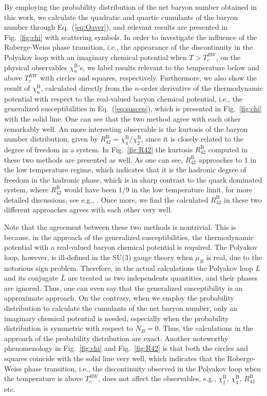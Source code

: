 \documentclass[%
reprint,
superscriptaddress,
showpacs,preprintnumbers,
 amsmath,amssymb,
 aps,
prd,
]{revtex4-1}
\def\Fig#1{Fig.~\ref{#1}} \def\Tab#1{Tab.~\ref{#1}}
\def\Eq#1{Eq.~(\ref{#1})}
\begin{document}
By employing the probability distribution of the net baryon number obtained in this work, we calculate the quadratic and quartic cumulants of the baryon number through \Eq{eq:Oaver}, and relevant results are presented in \Fig{fig:chi} with scattering symbols. In order to investigate the influence of the Roberge-Weiss phase transition, i.e., the appearance of the discontinuity in the Polyakov loop with an imaginary chemical potential when $T>T_c^{RW}$, on the physical observables $\chi^{\text{B}}_{n}$'s, we label results relevant to the temperature below and above $T_c^{RW}$ with circles and squares, respectively. Furthermore, we also show the result of $\chi^{\text{B}}_{n}$, calculated directly from the $n$-order derivative of the thermodynamic potential with respect to the real-valued baryon chemical potential, i.e., the generalized susceptibilities in \Eq{eq:suscep}, which is presented in \Fig{fig:chi} with the solid line. One can see that the two method agree with each other remarkably well. An more interesting observable is the kurtosis of the baryon number distribution, given by $R^{\text{B}}_{42}=\chi^{\text{B}}_{4}/\chi^{\text{B}}_{2}$, since it is closely related to the degree of freedom in a system. In \Fig{fig:R42} the kurtosis $R^{\text{B}}_{42}$ computed in these two methods are presented as well. As one can see, $R^{\text{B}}_{42}$ approaches to 1 in the low temperature regime, which indicates that it is the hadronic degree of freedom in the hadronic phase, which is in sharp contrast to the quark dominated system, where $R^{\text{B}}_{42}$ would have been 1/9 in the low temperature limit, for more detailed discussions, see e.g., \cite{Fu:2015naa}. Once more, we find the calculated  $R^{\text{B}}_{42}$ in these two different approaches agrees with each other very well.

Note that the agreement between these two methods is nontrivial. This is because, in the approach of the generalized susceptibilities, the thermodynamic potential with a real-valued baryon chemical potential is required. The Polyakov loop, however, is ill-defined in the SU(3) gauge theory when $\mu_B$ is real, due to the notorious sign problem. Therefore, in the actual calculations the Polyakov loop $L$ and its conjugate $\bar{L}$ are treated as two independents quantities, and their phases are ignored. Thus, one can even say that the generalized susceptibility is an approximate approach. On the contrary, when we employ the probability distribution to calculate the cumulants of the net baryon number, only an imaginary chemical potential is needed, especially when the probability distribution is symmetric with respect to $N_B=0$. Thus, the calculations in the approach of the probability distribution are exact. Another noteworthy phenomenology in \Fig{fig:chi} and \Fig{fig:R42} is that both the circles and squares coincide with the solid line very well, which indicates that the Roberge-Weiss phase transition, i.e., the discontinuity observed in the Polyakov loop when the temperature is above $T_c^{RW}$, does not affect the observables, e.g., $\chi^{\text{B}}_{2}$, $\chi^{\text{B}}_{4}$, $R^{\text{B}}_{42}$ etc.
\end{document}

